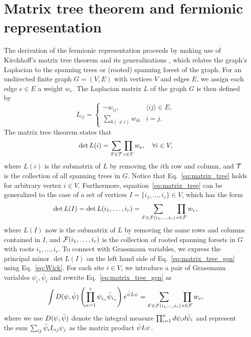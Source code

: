 \section{Matrix tree theorem and fermionic representation}
The derivation of the fermionic representation proceeds by making use of Kirchhoff's matrix tree theorem \cite{Kirchhoff1847} and its
generalizations \cite{Chaiken1982, Moon1994}, which relates the graph's Laplacian to the spanning trees or (rooted) spanning forest of the graph. 
For an undirected finite graph $G = (V, E)$ with vertices $V$ and edges $E$, we assign each edge $e \in E$ a weight $w_e$. The Laplacian matrix $L$ of 
the graph $G$ is then defined by
\begin{equation}
	L_{ij} =
	\begin{cases}
	-w_{ij}, & \langle ij \rangle \in E, \\
	\sum_{k(\neq i)} w_{ik} & i = j.
	\end{cases}
\end{equation}
The matrix tree theorem states that
\begin{equation}\label{eq:matrix_tree}
	\operatorname{det} L(i) = \sum_{T \in {\mathcal T}} \prod_{e\in T} w_e, \quad \forall i \in V,
\end{equation}
where $L(i)$ is the submatrix of $L$ by removing the $i$th row and column, and ${\mathcal T}$ is the collection of all spanning trees in $G$.
Notice that Eq.~\eqref{eq:matrix_tree} holds for arbitrary vertex $i \in V$. Furthermore, equation~\eqref{eq:matrix_tree} can be 
generalized to the case of a set of vertices $I = \{i_1, \dots, i_r\} \in V$, which has the form
\begin{equation}\label{eq:matrix_tree_gen}
	\operatorname{det}L(I) = \operatorname{det}L (i_1, \dots, i_r) = \sum_{F \in {\mathcal F}(i_1, \dots, i_r)} \prod_{e \in F} w_e, 
\end{equation}
where $L(I)$ now is the submatrix of $L$ by removing the same rows and columns contained in $I$, and ${\mathcal F}(i_1, \dots, i_r)$ is the collection
of rooted spanning forests in $G$ with roots $i_1, \dots, i_r$.
To connect with Grassmann variables, we express the principal minor $\operatorname{det} L(I)$ on the left hand side of Eq.~\eqref{eq:matrix_tree_gen} using Eq.~\eqref{eq:Wick}.
For each site $i \in V$, we introduce a pair of Grassmann variables $\psi_i, \bar{\psi}_i$ and rewrite Eq.~\eqref{eq:matrix_tree_gen} as
\begin{equation}\label{eq:matrix_tree_Grassmann}
	\int D({\psi}, \bar{{\psi}})\left(\prod_{\alpha=1}^r \psi_{i_{\alpha}} \bar{\psi}_{i_{\alpha}}\right)e^{\bar{{\psi}} L {\psi}} 
	=\sum_{F \in {\mathcal F}(i_1, \dots, i_r)} \prod_{e \in F} w_e, 
\end{equation}
where we use $D({\psi}, \bar{{\psi}})$ denote the integral measure $\prod_{i=1}^n d{\psi}_i d\bar{{\psi}}_i$ and 
represent the sum $\sum_{ij} \bar{{\psi}}_i L_{ij} {\psi}_j$ as the matrix product $\bar{{\psi}} L {\psi}$. 

